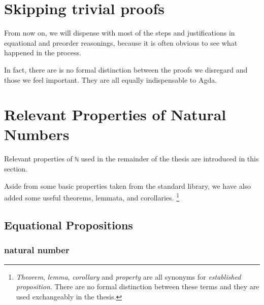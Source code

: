 \documentclass[../thesis.tex]{subfiles}
\begin{document}


%
%

\section{Skipping trivial proofs}

From now on, we will dispense with most of the steps and justifications in
equational and preorder reasonings,
because it is often obvious to see what happened in the process.

In fact, there are is no formal distinction between the proofs we disregard and
those we feel important. They are all equally indispensable to Agda.

\section{Relevant Properties of Natural Numbers}

Relevant properties of {\lstinline|ℕ|} used in the remainder of the thesis
are introduced in this section.

Aside from some basic properties taken from the standard library, we have
also added some useful theorems, lemmata, and corollaries.
\footnote{\textit{Theorem}, \textit{lemma}, \textit{corollary} and \textit{property}
are all synonyms for \textit{established proposition}. There are no formal
distinction between these terms and they are used exchangeably in the thesis.}

\subsection{Equational Propositions}

\subsubsection{natural number}
\end{document}

